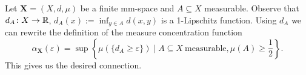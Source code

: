 Let $\boldsymbol{X}=(X,d,\mu)$ be a finite mm-space and $A\subseteq X$ measurable. Observe that $d_A\colon X\to\mathbb{R}$, $d_A(x):=\inf_{y\in A}d(x,y)$ is a 1-Lipschitz function. Using $d_A$ we can rewrite the definition of the measure concentration function 
\[\alpha_{\boldsymbol{X}}(\varepsilon)=\sup\left\lbrace\mu(\{d_A\geq\varepsilon\})\mid A\subseteq X\ \text{measurable},\mu(A)\geq\frac{1}{2}\right\rbrace.\]
This gives us the desired connection.
		
		
